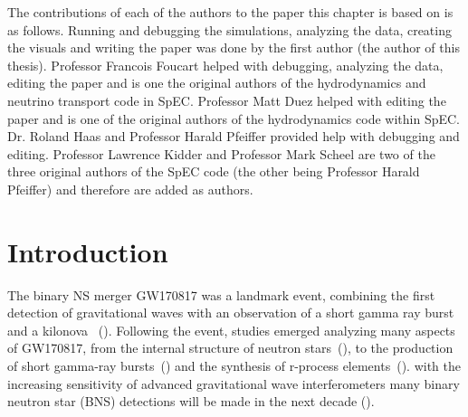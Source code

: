 The contributions of each of the authors to the paper this chapter is based on is as follows. Running and debugging the simulations, analyzing the data, creating the visuals and writing the paper was done by the first author (the author of this thesis). Professor Francois Foucart helped with debugging, analyzing the data, editing the paper and is one the original authors of the hydrodynamics and neutrino transport code in SpEC. Professor Matt Duez helped with editing the paper and is one of the original authors of the hydrodynamics code within SpEC. Dr. Roland Haas and Professor Harald Pfeiffer provided help with debugging and editing. Professor Lawrence Kidder and Professor Mark Scheel are two of the three original authors of the SpEC code (the other being Professor Harald Pfeiffer) and therefore are added as authors. 

\section{Introduction}


The binary NS merger GW170817 was a landmark event, combining the first detection of gravitational waves
with an observation of a short gamma ray burst and a kilonova ~(\cite{theligoscientific:2017qsa,gbm:2017lvd,2017apj...848l..13a,ajello2018fermi}). Following the event, studies emerged analyzing many aspects of GW170817, from the
internal structure of neutron stars~(\cite{read:2008iy,delpozzo:13,lackey2014,gw170817-nsradius,gw170817-pe}), to the production of short gamma-ray bursts~(\cite{moch:93,lee1999a,janka1999,gbm:2017lvd,2017apj...848l..13a,2018natur.561..355m}) and the synthesis of r-process elements~(\cite{  li:1998bw,1976apj...210..549l,rosswog:1998hy, 2005astro.ph.10256k,2010mnras.406.2650m,metzger2017,2017sci...358.1559k,2017sci...358.1556c,2017apj...848l..19c,2017sci...358.1556c,cowperthwaite:2017dyu,2017natur.551...80k,2017sci...358.1583k,2017apj...848l..32m,2017apj...848l..18n,2017natur.551...67p,2017natur.551...75s,2017apj...848l..16s,2017apj...848l..27t,2017sci...358.1565e}). with the increasing sensitivity of advanced gravitational wave
interferometers many binary neutron star (BNS) detections will
be made in the next decade (\cite{ligo2018gwtc}).

